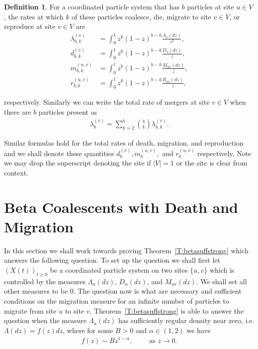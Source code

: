 \documentclass[11pt]{article}
\theoremstyle{definition}
\newtheorem{defi}{Definition}
\newcommand{\thmref}[1]{Theorem~\ref{T:#1}}
\begin{document}
\begin{defi}\label{D:rates}
    For a coordinated particle system that has $b$ particles at site $u \in V$, the rates at which $k$ of these particles coalesce, die, migrate to site $v \in V$, or reproduce at site $v \in V$ are
    \begin{align*}
        \lambda_{b,k}^{(v)} &= \int_{0}^1 z^k(1-z)^{b-k} \frac{\Lambda_v(dz)}{z^2},\\
        d_{b,k}^{(v)} &= \int_{0}^1 z^k(1-z)^{b-k} \frac{D_v(dz)}{z},\\
        m_{b,k}^{(u,v)} &= \int_{0}^1 z^k(1-z)^{b-k} \frac{M_{uv}(dz)}{z},\\
        r_{b,k}^{(u,v)} &= \int_{0}^1 z^k(1-z)^{b-k} \frac{R_{uv}(dz)}{z},
    \end{align*}

    \noindent respectively. Similarly we can write the total rate of mergers at site $v \in V$ when there are $b$ particles present as
    \begin{align*}
        \lambda_b^{(v)} = \sum_{k = 2}^b \binom{b}{k} \lambda_{b,k}^{(v)}.
    \end{align*}

    \noindent Similar formulas hold for the total rates of death, migration, and reproduction and we shall denote these quantities $d_b^{(v)}, m_{b}^{(u,v)},$ and $r_{b}^{(u,v)}$ respectively. Note we may drop the superscript denoting the site if $|V| = 1$ or the site is clear from context.
\end{defi}


\section{Beta Coalescents with Death and Migration}

\noindent In this section we shall work towards proving \thmref{betasuffstrong} which answers the following question. To set up the question we shall first let $(X(t))_{t \geq 0}$ be a coordinated particle system on two sites $\{u,v\}$ which is controlled by the measures $\Lambda_u(dz)$, $D_u(dz)$, and $M_{uv}(dz)$. We shall set all other measures to be $0$. The question now is what are necessary and sufficient conditions on the migration measure for an infinite number of particles to migrate from site $u$ to site $v$. \thmref{betasuffstrong} is able to answer the question when the measure $\Lambda_u(dz)$ has sufficiently regular density near zero, i.e. $\Lambda(dz) = f(z)dz$, where for some $B > 0$ and $\alpha \in (1,2)$ we have
%
\begin{align*}\label{eq:density}\tag{$\star$}
    f(z) \sim Bz^{1-\alpha}, \qquad \text{ as $z \to 0$}.
\end{align*}
\end{document}
